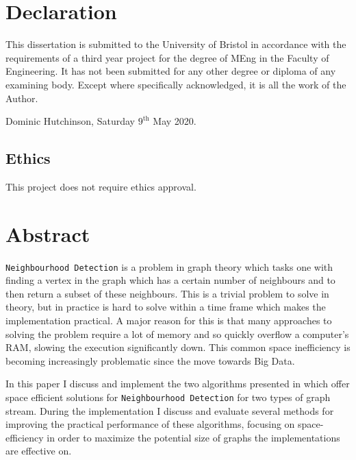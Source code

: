 \documentclass[11pt,twoside,a4paper]{report}
\begin{document}
\chapter*{Declaration}
\par This dissertation is submitted to the University of Bristol in accordance with the requirements of a third year project for the degree of MEng in the Faculty of Engineering. It has not been submitted for any other degree or diploma of any examining body. Except where specifically acknowledged, it is all the work of the Author.
\par\vspace{5cm}
\par\noindent Dominic Hutchinson, Saturday $9^\text{th}$ May 2020.

\section*{Ethics}
\par This project does not require ethics approval.

\tableofcontents
\newpage

\chapter*{Abstract}

\par \texttt{Neighbourhood Detection} is a problem in graph theory which tasks one with finding a vertex in the graph which has a certain number of neighbours and to then return a subset of these neighbours. This is a trivial problem to solve in theory, but in practice is hard to solve within a time frame which makes the implementation practical. A major reason for this is that many approaches to solving the problem require a lot of memory and so quickly overflow a computer's RAM, slowing the execution significantly down. This common space inefficiency is becoming increasingly problematic since the move towards Big Data.

\par In this paper I discuss and implement the two algorithms presented in \cite{orig} which offer space efficient solutions for \texttt{Neighbourhood Detection} for two types of graph stream. During the implementation I discuss and evaluate several methods for improving the practical performance of these algorithms, focusing on space-efficiency in order to maximize the potential size of graphs the implementations are effective on.
\end{document}
